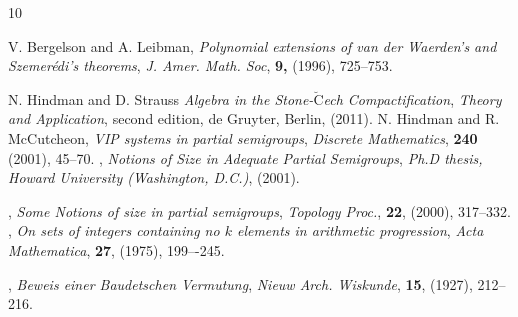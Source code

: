 \documentclass{amsart}
\theoremstyle{definition}
\theoremstyle{remark}
\numberwithin{equation}{section}
\begin{document}

\begin{thebibliography}{10}

	\newblock V. Bergelson and A. Leibman, 
	\newblock \textit{Polynomial extensions of van der Waerden’s and Szemer{\'e}di’s theorems},
	\newblock \emph{J. Amer. Math. Soc}, \textbf{9,} (1996), 725--753.

	\newblock N. Hindman and D. Strauss %
	\newblock  \textit{Algebra in the Stone-$\breve{\mbox{C}}$ech Compactification},
	\newblock \emph{Theory and
		Application},  \newblock  second edition, de Gruyter, Berlin, (2011).
	\newblock N. Hindman and R. McCutcheon, %
	\newblock \textit{VIP systems in partial semigroups},
	\newblock \emph{ Discrete Mathematics}, \textbf{ 240} (2001), 45--70.
, 
\newblock \textit{Notions of Size in Adequate Partial Semigroups}, 
\newblock \emph{Ph.D thesis, Howard University (Washington, D.C.)},
 (2001).


,
\newblock \textit{Some Notions of size in partial semigroups},
\newblock \emph{Topology Proc.},
\textbf{22}, (2000), 317--332.
,
\newblock \textit{On sets of integers containing no $k$ elements in arithmetic progression},
\newblock \emph{Acta Mathematica},
\textbf{27}, (1975), 199–-245.

	,
	\newblock \textit{Beweis einer Baudetschen Vermutung},
	\newblock \emph{Nieuw Arch. Wiskunde},
	\textbf{15}, (1927), 212--216. 


\end{thebibliography}
\end{document}
